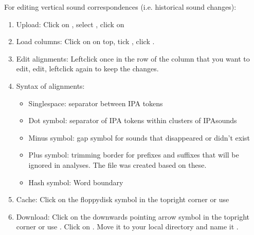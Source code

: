 \documentclass[letterpaper,10pt,english]{sphinxmanual}
\begin{document}
{{{{\sphinxAtStartPar
For editing vertical sound correspondences (i.e. historical sound changes):
\begin{enumerate}
%
\item {} 
\sphinxAtStartPar
Upload: Click on , select , click on

\item {} 
\sphinxAtStartPar
Load columns: Click on  on top, tick ,
click .

\item {} 
\sphinxAtStartPar
Edit alignments: Left\sphinxhyphen{}click once in the row of the 
column that you want to edit, edit, left\sphinxhyphen{}click again to keep the changes.

\item {} 
\sphinxAtStartPar
Syntax of alignments:
\begin{itemize}
\item {} 
\sphinxAtStartPar
Single\sphinxhyphen{}space: separator between IPA tokens

\item {} 
\sphinxAtStartPar
Dot symbol: separator of IPA tokens within clusters of IPA\sphinxhyphen{}sounds

\item {} 
\sphinxAtStartPar
Minus symbol: gap symbol for sounds that disappeared or didn’t exist

\item {} 
\sphinxAtStartPar
Plus symbol: trimming border for prefixes and suffixes that will be
ignored in analyses. The file  was created
based on these.

\item {} 
\sphinxAtStartPar
Hash symbol: Word boundary

\end{itemize}

\item {} 
\sphinxAtStartPar
Cache: Click on the floppy\sphinxhyphen{}disk symbol in the top\sphinxhyphen{}right corner or use

\item {} 
\sphinxAtStartPar
Download: Click on the downwards pointing arrow symbol in the top\sphinxhyphen{}right
corner or use . Click on . Move it to your local
 directory and name it .


\end{enumerate}}}}}
\end{document}

